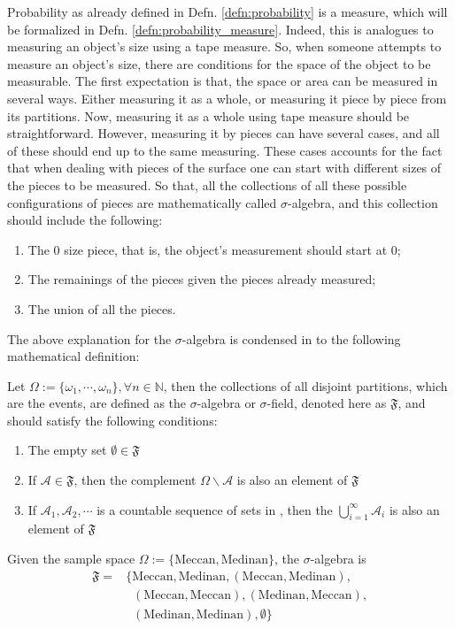 Probability as already defined in Defn. \ref{defn:probability} is a measure, which will be formalized in Defn. \ref{defn:probability_measure}. Indeed, this is analogues to measuring an object's size using a tape measure. So, when someone attempts to measure an object's size, there are conditions for the space of the object to be measurable. The first expectation is that, the space or area can be measured in several ways. Either measuring it as a whole, or measuring it piece by piece from its partitions. Now, measuring it as a whole using tape measure should be straightforward. However, measuring it by pieces can have several cases, and all of these should end up to the same measuring. These cases accounts for the fact that when dealing with pieces of the surface one can start with different sizes of the pieces to be measured. So that, all the collections of all these possible configurations of pieces are mathematically called $\sigma$-algebra, and this collection should include the following:
\begin{enumerate}
    \item The 0 size piece, that is, the object's measurement should start at 0;
    \item The remainings of the pieces given the pieces already measured;
    \item The union of all the pieces.
\end{enumerate}
The above explanation for the $\sigma$-algebra is condensed in to the following mathematical definition:
\begin{defn}\label{defn:sigma_algebra}
Let $\Omega:=\{\omega_1,\cdots,\omega_n\}, \forall n\in\mathbb{N}$, then the collections of all disjoint partitions, which are the events, are defined as the $\sigma$-algebra or $\sigma$-field, denoted here as $\mathfrak{F}$, and should satisfy the following conditions:
\begin{enumerate}
    \item The empty set $\emptyset\in\mathfrak{F}$
    \item If $\mathscr{A}\in\mathfrak{F}$, then the complement $\Omega\backslash\mathscr{A}$ is also an element of $\mathfrak{F}$
    \item If $\mathscr{A}_1,\mathscr{A}_2,\cdots$ is a countable sequence of sets in , then the $\bigcup_{i=1}^{\infty}\mathscr{A}_i$ is also an element of $\mathfrak{F}$
\end{enumerate}
\end{defn}
\begin{exmp}
Given the sample space $\Omega:=\{\text{Meccan},\text{Medinan}\}$, the $\sigma$-algebra is
\begin{align}
    \mathfrak{F}=&\{\text{Meccan},\text{Medinan},(\text{Meccan},\text{Medinan}),\nonumber\\
    &\;\;(\text{Meccan},\text{Meccan}), (\text{Medinan},\text{Meccan}),\nonumber\\
    &\;\;(\text{Medinan},\text{Medinan}),\emptyset\}
\end{align}

\end{exmp}
